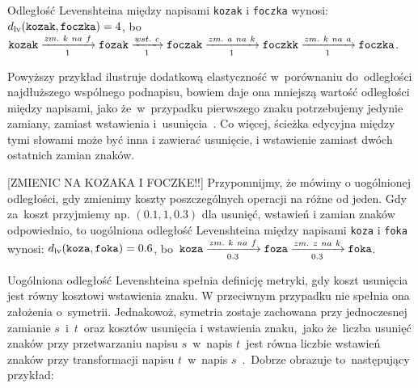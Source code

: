 \documentclass{praca1}
\begin{document}

\begin{example}
Odległość Levenshteina między napisami \verb|kozak| i \verb|foczka| wynosi: $d_{\mathrm{lv}}(\verb|kozak|, \verb|foczka|) = 4$, bo $\verb|kozak| \xrightarrow[1]{zm.\ k\ na\ f} \verb|fozak|  \xrightarrow[1]{wst.\ c} \verb|foczak| \xrightarrow[1]{zm.\ a\ na\ k} \verb|foczkk| \xrightarrow[1]{zm.\ k\ na\ a} \verb|foczka|$.
\end{example}

Powyższy przykład ilustruje dodatkową elastyczność w~porównaniu do~odległości najdłuższego wspólnego podnapisu, bowiem daje ona mniejszą wartość odległości między napisami, jako że~w~przypadku pierwszego znaku potrzebujemy jedynie zamiany, zamiast wstawienia i~usunięcia~\cite{Loo2014:stringdist}. Co więcej, ścieżka edycyjna między tymi słowami może być inna i zawierać usunięcie, i wstawienie zamiast dwóch ostatnich zamian znaków.


[ZMIENIC NA KOZAKA I FOCZKE!!] 
Przypomnijmy, że mówimy o uogólnionej odległości, gdy zmienimy koszty poszczególnych operacji na różne od jeden.
Gdy za~koszt przyjmiemy np. $(0.1, 1, 0.3)$ dla usunięć, wstawień i zamian znaków odpowiednio, to uogólniona odległość Levenshteina między napisami \verb|koza| i \verb|foka| wynosi: $d_{\mathrm{lv}}(\verb|koza|, \verb|foka|) = 0.6$, bo~$\verb|koza|  \xrightarrow[0.3]{zm.\ k\ na\ f} \verb|foza|  \xrightarrow[0.3]{zm.\ z\ na\ k} \verb|foka|$.

Uogólniona odległość Levenshteina spełnia definicję metryki, gdy koszt usunięcia jest równy kosztowi wstawienia znaku. W przeciwnym przypadku nie spełnia ona założenia o~symetrii. Jednakowoż, symetria zostaje zachowana przy jednoczesnej zamianie $s$~i~$t$~oraz kosztów usunięcia i wstawienia znaku,~jako że~liczba usunięć znaków przy przetwarzaniu napisu $s$~w~napis $t$~jest równa liczbie wstawień znaków przy transformacji napisu $t$~w~napis $s$~\cite{Loo2014:stringdist}.~Dobrze obrazuje to~następujący przykład:
\end{document}
